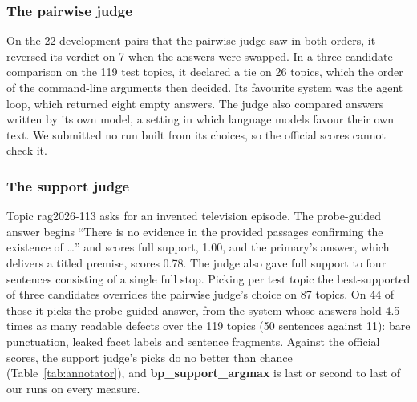 \documentclass[sigconf,nonacm]{acmart}
\newcommand{\run}[1]{\mbox{\textbf{#1}}}   %
\begin{document}
\subsubsection{The pairwise judge}
On the 22 development pairs that the pairwise judge saw in both orders, it reversed
its verdict on 7 when the answers were swapped. In a three-candidate comparison on
the 119 test topics, it declared a tie on 26 topics, which the order of the
command-line arguments then decided. Its favourite system was the agent loop, which
returned eight empty answers. The judge also compared answers written by its own
model, a setting in which language models favour their own text. We submitted no run
built from its choices, so the official scores cannot check it.

\subsubsection{The support judge}
\label{sec:refusal}
Topic rag2026-113 asks for an invented television episode. The probe-guided answer
begins ``There is no evidence in the provided passages confirming the existence of
\ldots{}'' and scores full support, 1.00, and the primary's answer, which delivers a
titled premise, scores 0.78. The judge also gave full support to four sentences consisting of a single full stop.
Picking per test topic the best-supported of three candidates overrides the pairwise
judge's choice on 87 topics. On 44 of those it picks the probe-guided answer, from
the system whose answers hold 4.5 times as many readable defects over the 119 topics
(50 sentences against 11): bare punctuation, leaked facet labels and sentence
fragments. Against the official scores, the support judge's picks do no better than
chance (Table~\ref{tab:annotator}), and \run{bp\_support\_argmax} is last or second
to last of our runs on every measure.
\end{document}

